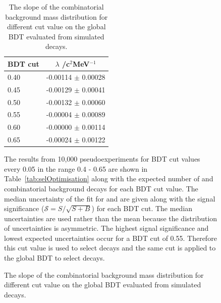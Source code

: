 \begin{figure}[tbp]
{\begin{table}[htbp]
\begin{center}
\begin{tabular}{lc}
\hline
BDT cut & $\lambda$ /c$^{2}$MeV$^{-1}$\\ \hline
0.40 & -0.00114 $\pm$ 0.00028 \\
0.45 & -0.00129 $\pm$ 0.00041 \\
0.50 & -0.00132 $\pm$ 0.00060 \\
0.55 & -0.00004 $\pm$ 0.00089 \\
0.60 & -0.00000 $\pm$ 0.00114 \\
0.65 & -0.00024 $\pm$ 0.00122 \\ \hline
\end{tabular}
\vspace{0.7cm}
\caption{The slope of the combinatorial background mass distribution for different cut value on the global BDT evaluated from \bbbarmumux simulated decays.}
\label{tab:CBGSlopeBDT}
\end{center}
\vspace{-1.0cm}
\end{table}



The results from 10,000 pseudoexperiments for BDT cut values every 0.05 in the range 0.4 - 0.65 are shown in Table~\ref{tab:selOptimisation} along with the expected number of \bsmumu and combinatorial background decays for each BDT cut value. The median uncertainty of the fit for \tmumu and \invtmumu are given along with the signal significance ($\mathcal{S} = S/\sqrt{S+B}$) for each BDT cut. The median uncertainties are used rather than the mean because the distribution of uncertainties is asymmetric. The highest signal significance and lowest expected uncertainties occur for a BDT cut of 0.55. Therefore this cut value is used to select \bsmumu decays and the same cut is applied to the global BDT to select \bhh decays. 


}
\end{figure}
